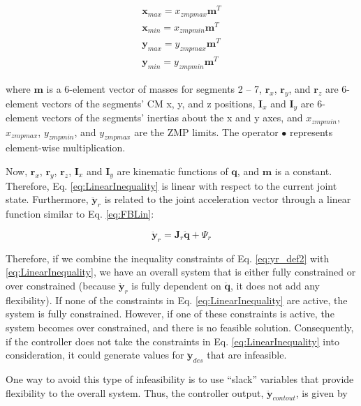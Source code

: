 \documentclass{llncs}
\begin{document}
\begin{eqnarray}
\mathbf{x}_{max} = x_{zmpmax} \mathbf{m}^T\\
\mathbf{x}_{min} = x_{zmpmin} \mathbf{m}^T\\
\mathbf{y}_{max} = y_{zmpmax} \mathbf{m}^T\\
\mathbf{y}_{min} = y_{zmpmin} \mathbf{m}^T
\label{eq:SupportLimits}
\end{eqnarray}

\noindent where $\mathbf{m}$ is a 6-element vector of masses for segments 2 – 7, $\mathbf{r}_x$, $\mathbf{r}_y$, and $\mathbf{r}_z$ 
are 6-element vectors of the segments’ CM x, y, and z positions, $\mathbf{I}_x$ and $\mathbf{I}_y$ are 6-element vectors of the segments’ inertias 
about the x and y axes, and $x_{zmpmin}$, $x_{zmpmax}$, $y_{zmpmin}$, and $y_{zmpmax}$ are the ZMP limits.  The operator $\bullet$ represents element-wise multiplication.

Now, $\mathbf{r}_x$, $\mathbf{r}_y$, $\mathbf{r}_z$, $\mathbf{I}_x$ and $\mathbf{I}_y$ are kinematic functions of $\mathbf{q}$, and $\mathbf{m}$ is a constant.
Therefore, Eq. \ref{eq:LinearInequality} is linear with respect to the current joint state.  
Furthermore, $\ddot{\mathbf{y}}_r$ is related to the joint acceleration vector through a linear function similar to Eq. \ref{eq:FBLin}:

\begin{equation}
\ddot{\mathbf{y}}_r = \mathbf{J}_r \ddot{\mathbf{q}} + \Psi_r
\label{eq:yr_def2}
\end{equation}

\noindent Therefore, if we combine the inequality constraints of Eq. \ref{eq:yr_def2} with \ref{eq:LinearInequality}, we have an overall system that is either 
fully constrained or over constrained (because $\ddot{\mathbf{y}}_r$ is fully dependent on $\ddot{\mathbf{q}}$, it does not add any flexibility).  
If none of the constraints in Eq. \ref{eq:LinearInequality} are active, the system is fully constrained.  
However, if one of these constraints is active, the system becomes over constrained, and there is no feasible solution.  
Consequently, if the controller does not take the constraints in Eq. \ref{eq:LinearInequality} into consideration, it could generate values for $\ddot{\mathbf{y}}_{des}$
that are infeasible.

One way to avoid this type of infeasibility is to use “slack” variables that provide flexibility to the overall system.  
Thus, the controller output, $\ddot{\mathbf{y}}_{contout}$, is given by
\end{document}
